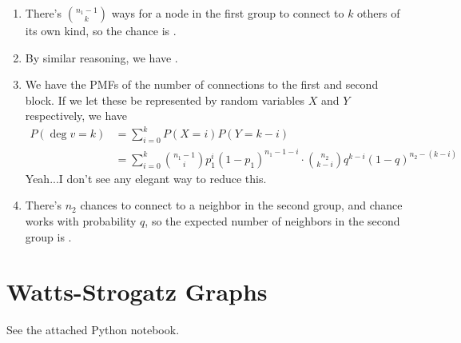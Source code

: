 \documentclass[12pt]{article}
\begin{document}
\begin{enumerate}
      \item There's $\binom{n_1-1}{k}$ ways for a node in the first group
            to connect to $k$ others of its own kind, so the chance is
            .

      \item By similar reasoning, we have .

      \item We have the PMFs of the number of connections to the first and second block.
            If we let these be represented by random variables $X$ and $Y$ respectively, we have
            \begin{align*}
                  P(\deg v = k)
                   & = \sum_{i=0}^{k} P(X=i)P(Y=k-i)                                                                        \\
                   & = \sum_{i=0}^{k} \binom{n_1-1}{i}p_1^i(1-p_1)^{n_1-1-i} \cdot \binom{n_2}{k-i}q^{k-i}(1-q)^{n_2-(k-i)}
            \end{align*}
            Yeah...I don't see any elegant way to reduce this.

      \item There's $n_2$ chances to connect to a neighbor in the second group,
            and chance works with probability $q$, so the expected
            number of neighbors in the second group is .
\end{enumerate}

\section{Watts-Strogatz Graphs}

See the attached Python notebook.
\end{document}
